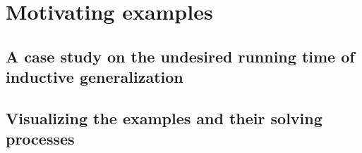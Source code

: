 \chapter{Motivating examples}
\section{A case study on the undesired running time of inductive generalization}
\section{Visualizing the examples and their solving processes}